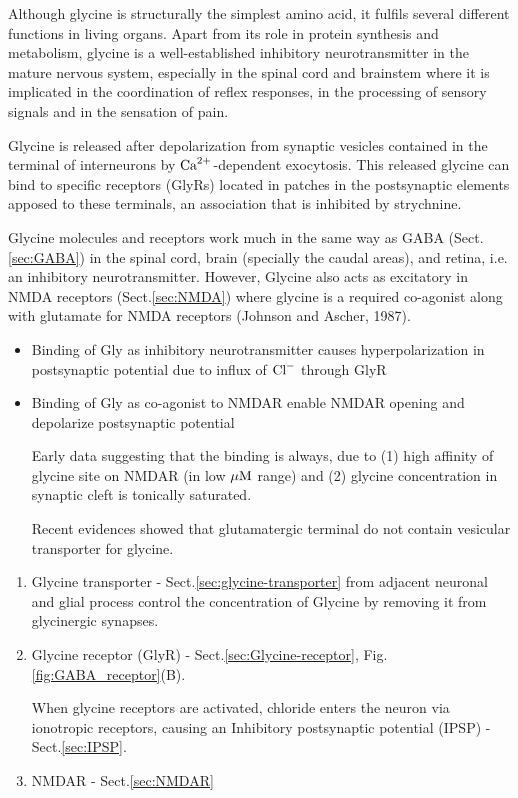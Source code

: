 Although glycine is structurally the simplest amino acid, it fulfils several
different functions in living organs.
Apart from its role in protein synthesis and metabolism, glycine is a
well-established inhibitory neurotransmitter in the mature nervous system,
especially in the spinal cord and brainstem where it is implicated in the
coordination of reflex responses, in the processing of sensory signals and in
the sensation of pain.

Glycine is released after depolarization from synaptic vesicles contained in the
terminal of interneurons by ${\text{Ca}^{2+}}$-dependent exocytosis.
This released glycine can bind to specific receptors (GlyRs) located in patches
in the postsynaptic elements apposed to these terminals, an association that is
inhibited by strychnine.

Glycine molecules and receptors work much in the same way as GABA
(Sect.\ref{sec:GABA}) in the spinal cord, brain (specially the caudal areas),
and retina, i.e. an inhibitory neurotransmitter.
However, Glycine also acts as excitatory in NMDA receptors (Sect.\ref{sec:NMDA})
where glycine is a required co-agonist along with glutamate for NMDA receptors
(Johnson and Ascher, 1987).
\begin{itemize}
  \item Binding of Gly as inhibitory neurotransmitter causes hyperpolarization
  in postsynaptic potential due to influx of ${\text{Cl}^{-}}$ through GlyR
  
  \item Binding of Gly as co-agonist to NMDAR enable NMDAR opening and depolarize postsynaptic potential
  
Early data suggesting that the binding is always, due to (1) high affinity of
glycine site on NMDAR (in low ${\mu\text{M}}$ range) and (2) glycine concentration in
synaptic cleft is tonically saturated.

Recent evidences showed that glutamatergic terminal do not contain vesicular
transporter for glycine.
\end{itemize}


\begin{enumerate}
  \item Glycine transporter - Sect.\ref{sec:glycine-transporter} from adjacent
  neuronal and glial process control the concentration of
  Glycine by removing it from glycinergic synapses.
  
  \item Glycine receptor (GlyR) - Sect.\ref{sec:Glycine-receptor},
  Fig.\ref{fig:GABA_receptor}(B).

When glycine receptors are activated, chloride enters the neuron via ionotropic
receptors, causing an Inhibitory postsynaptic potential (IPSP) -
Sect.\ref{sec:IPSP}.

  \item NMDAR - Sect.\ref{sec:NMDAR}
\end{enumerate}

